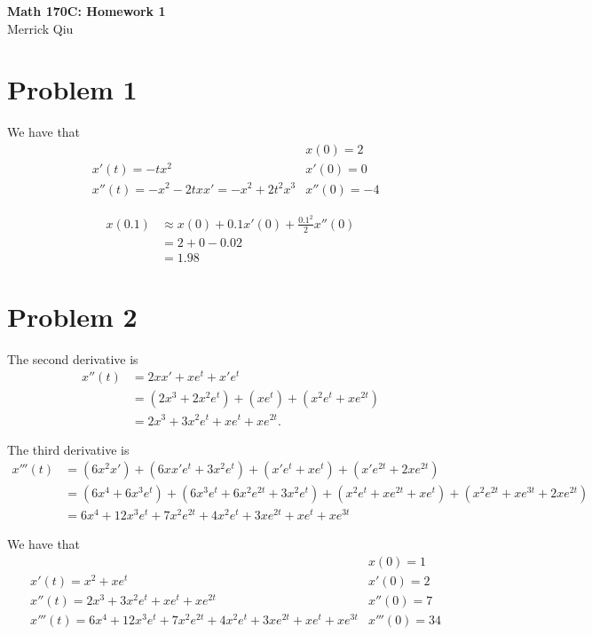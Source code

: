 \documentclass{article}
\begin{document}
\begin{center}
	\huge{\bf Math 170C: Homework 1} \\
	Merrick Qiu
\end{center}

\section*{Problem 1}
We have that
\begin{align*}
  & &x(0) = 2 \\
  &x'(t) = -tx^2 &x'(0) = 0 \\
  &x''(t) = -x^2 - 2txx' = -x^2 + 2t^2x^3 &x''(0) = -4
\end{align*}

\begin{align*}
  x(0.1) &\approx x(0) + 0.1 x'(0) + \frac{0.1^2}{2}x''(0)\\
  &= 2 + 0 - 0.02 \\
  &= 1.98
\end{align*}
\newpage 

\section*{Problem 2}
The second derivative is
\begin{align*}
  x''(t) &= 2xx' + xe^t + x'e^t  \\
  &= (2x^3 + 2x^2e^t) + (xe^t) + (x^2e^t + xe^{2t}) \\
  &=  2x^3 + 3x^2e^t + xe^t + xe^{2t}.
\end{align*}

The third derivative is
\begin{align*}
  x'''(t) &= (6x^2x') + (6xx'e^t + 3x^2e^t) + (x'e^t + xe^t) + (x'e^{2t} + 2xe^{2t})\\
  &= (6x^4 + 6x^3e^t) + (6x^3e^t + 6x^2e^{2t} + 3x^2e^t) + (x^2e^t + xe^{2t} + xe^t) + (x^2e^{2t} + xe^{3t} + 2xe^{2t})\\
  &=  6x^4 +12x^3e^t + 7 x^2e^{2t} + 4x^2e^t + 3xe^{2t} + xe^t + xe^{3t}
\end{align*}

We have that
\begin{align*}
  & &x(0) = 1 \\
  &x'(t) = x^2 + xe^t &x'(0) =  2\\
  &x''(t) = 2x^3 + 3x^2e^t + xe^t + xe^{2t}&x''(0) = 7 \\
  &x'''(t) = 6x^4 +12x^3e^t + 7 x^2e^{2t} + 4x^2e^t + 3xe^{2t} + xe^t + xe^{3t} & x'''(0) = 34
\end{align*}
\end{document}
